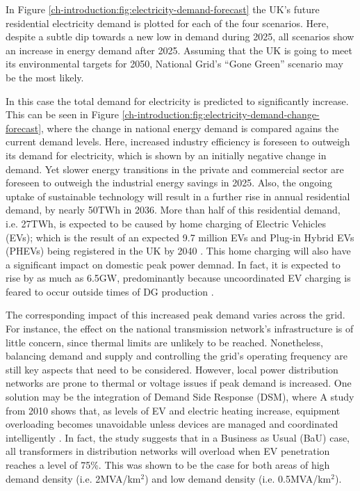 

In Figure \ref{ch-introduction:fig:electricity-demand-forecast} the UK's future residential electricity demand is plotted for each of the four scenarios.
Here, despite a subtle dip towards a new low in demand during 2025, all scenarios show an increase in energy demand after 2025.
Assuming that the UK is going to meet its environmental targets for 2050, National Grid's ``Gone Green'' scenario may be the most likely.

In this case the total demand for electricity is predicted to significantly increase.
This can be seen in Figure \ref{ch-introduction:fig:electricity-demand-change-forecast}, where the change in national energy demand is compared agains the current demand levels.
Here, increased industry efficiency is foreseen to outweigh its demand for electricity, which is shown by an initially negative change in demand.
Yet slower energy transitions in the private and commercial sector are foreseen to outweigh the industrial energy savings in 2025.
Also, the ongoing uptake of sustainable technology will result in a further rise in annual residential demand, by nearly 50TWh in 2036.
More than half of this residential demand, i.e. 27TWh, is expected to be caused by home charging of Electric Vehicles (EVs); which is the result of an expected 9.7 million EVs and Plug-in Hybrid EVs (PHEVs) being registered in the UK by 2040 \cite{DBER2008}.
This home charging will also have a significant impact on domestic peak power demnad.
In fact, it is expected to rise by as much as 6.5GW, predominantly because uncoordinated EV charging is feared to occur outside times of DG production \cite{FES2016}.



The corresponding impact of this increased peak demand varies across the grid.
For instance, the effect on the national transmission network's infrastructure is of little concern, since thermal limits are unlikely to be reached.
Nonetheless, balancing demand and supply and controlling the grid's operating frequency are still key aspects that need to be considered.
However, local power distribution networks are prone to thermal or voltage issues if peak demand is increased.
One solution may be the integration of Demand Side Response (DSM), where 
A study from 2010 shows that, as levels of EV and electric heating increase, equipment overloading becomes unavoidable unless devices are managed and coordinated intelligently \cite{Strbac2010}.
In fact, the study suggests that in a Business as Usual (BaU) case, all transformers in distribution networks will overload when EV penetration reaches a level of 75\%.
This was shown to be the case for both areas of high demand density (i.e. 2MVA/km$^2$) and low demand density (i.e. 0.5MVA/km$^2$).

